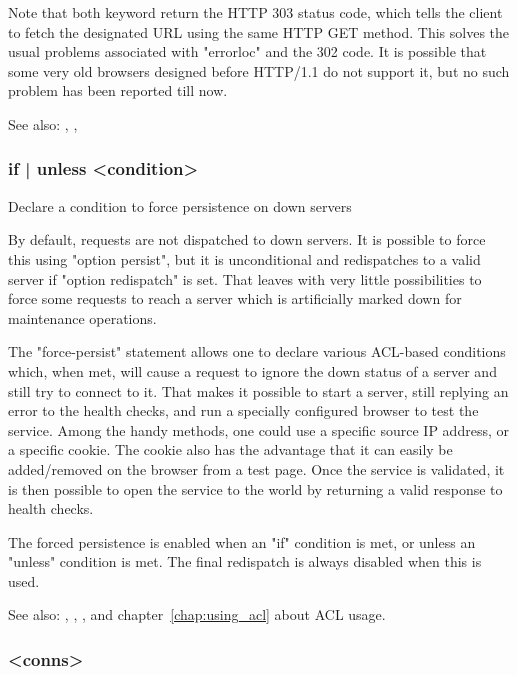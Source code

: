   Note that both keyword return the HTTP 303 status code, which tells the
  client to fetch the designated URL using the same HTTP GET method. This
  solves the usual problems associated with "errorloc" and the 302 code. It is
  possible that some very old browsers designed before HTTP/1.1 do not support
  it, but no such problem has been reported till now.


See also: , , 

\subsubsection[force-persist]{ { if | unless } <condition>}

  Declare a condition to force persistence on down servers
  

  By default, requests are not dispatched to down servers. It is possible to
  force this using "option persist", but it is unconditional and redispatches
  to a valid server if "option redispatch" is set. That leaves with very little
  possibilities to force some requests to reach a server which is artificially
  marked down for maintenance operations.

  The "force-persist" statement allows one to declare various ACL-based
  conditions which, when met, will cause a request to ignore the down status of
  a server and still try to connect to it. That makes it possible to start a
  server, still replying an error to the health checks, and run a specially
  configured browser to test the service. Among the handy methods, one could
  use a specific source IP address, or a specific cookie. The cookie also has
  the advantage that it can easily be added/removed on the browser from a test
  page. Once the service is validated, it is then possible to open the service
  to the world by returning a valid response to health checks.

  The forced persistence is enabled when an "if" condition is met, or unless an
  "unless" condition is met. The final redispatch is always disabled when this
  is used.


See also: , , ,
             and chapter~\ref{chap:using_acl} about ACL usage.

\subsubsection[fullconn]{ <conns>}

